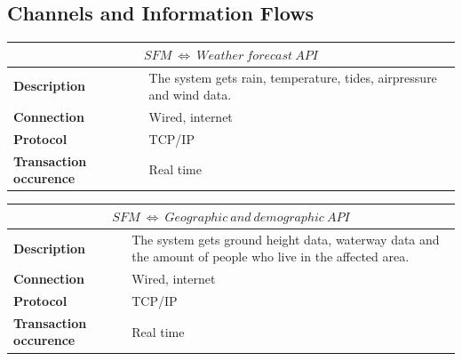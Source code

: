 \subsection{Channels and Information Flows}
\begin{table}[!htbp]
	\centering
    \begin{tabular}{L{} L{}}
    \toprule
     \\ \midrule
    \textbf{Description} & The system gets rain, temperature, tides, airpressure and wind data. \\
    \textbf{Connection} & Wired, internet \\
    \textbf{Protocol} & TCP/IP \\
    \textbf{Transaction occurence} & Real time \\
    \bottomrule
    \end{tabular}
\end{table}

\begin{table}[!htbp]
	\centering
    \begin{tabular}{L{} L{}}
    \toprule
     \\ \midrule
    \textbf{Description} & The system gets ground height data, waterway data and the amount of people who live in the affected area.\\
    \textbf{Connection} & Wired, internet \\
    \textbf{Protocol} & TCP/IP \\
    \textbf{Transaction occurence} & Real time \\
    \bottomrule
    \end{tabular}
\end{table}


